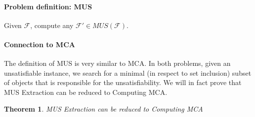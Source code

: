 \documentclass[]{article}
\newtheorem{theorem}{Theorem}
\begin{document}
	\paragraph{Problem definition: MUS} Given $ \mathcal{F} $, compute any $ \mathcal{F}' \in MUS(\mathcal{F}) $.
	
	\paragraph{Connection to MCA} The definition of MUS is very similar to MCA. In both problems, given an unsatisfiable instance, we search for a minimal (in respect to set inclusion) subset of objects that is responsible for the unsatisfiability. We will in fact prove that MUS Extraction can be reduced to Computing MCA.
	
	\begin{theorem}
		MUS Extraction can be reduced to Computing MCA
	\end{theorem}
\end{document}
